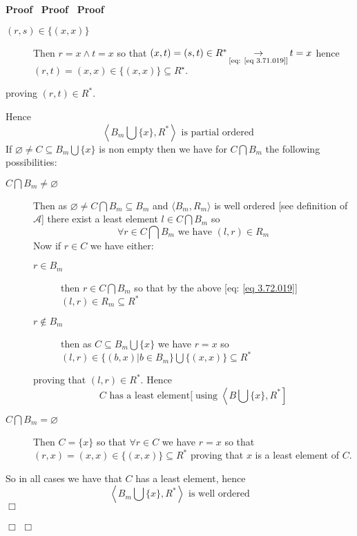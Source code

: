 \documentclass{book}
\newcommand{\Rightarrowlim}{\mathop{\rightarrow}\limits}
\newcommand{\nin}{\not\in}
\newcommand{\tmop}[1]{\ensuremath{\operatorname{#1}}}
\newenvironment{proof}{\noindent\textbf{Proof\ }}{\hspace*{\fill}$\Box$\medskip}
\begin{document}
\begin{proof}
\begin{proof}
\begin{proof}
\begin{description}
\begin{description}
          \item[$(r, s) \in \{ (x, x) \}$] Then $r = x \wedge t = x$ so that
          $(x, t) = (s, t) \in R^{\ast} \Rightarrowlim_{\text{[eq: \ref{eq
          3.71.019}]}} t = x$ hence $(r, t) = (x, x) \in \{ (x, x) \}
          \subseteq R^{\star} .$
        \end{description}
        proving $ (r, t) \in R^{\ast}$.
      \end{description}
      Hence
      \[ \left\langle B_m \bigcup \{ x \}, R^{\ast} \right\rangle \text{ is
         partial ordered } \]
      If $\varnothing \neq C \subseteq B_m \bigcup \{ x \}$ is non empty then
      we have for $C \bigcap B_m$ the following possibilities:
      \begin{description}
        \item[$C \bigcap B_m \neq \varnothing$] Then as $\varnothing \neq C
        \bigcap B_m \subseteq B_m$ and $\langle B_m, R_m \rangle$ is well
        ordered [see definition of $\mathcal{A}$] there exist a least element
        $l \in C \bigcap B_m$ so
        \begin{equation}
          \label{eq 3.72.019} \forall r \in C \bigcap B_m \text{ we have } (l,
          r) \in R_m
        \end{equation}
        Now if $r \in C$ we have either:
        \begin{description}
          \item[$r \in B_m$] then $r \in C \bigcap B_m$ so that by the above
          [eq: \ref{eq 3.72.019}] $(l, r) \in R_m \subseteq R^{\ast}$
          
          \item[$r \nin B_m$] then as $C \subseteq B_m \bigcup \{ x \}$ we
          have $r = x$ so $(l, r) \in \{ (b, x) |b \in B_m \} \bigcup \{ (x,
          x) \} \subseteq R^{\ast}$
        \end{description}
        proving that $(l, r) \in R^{\ast}$. Hence
        \[ C \text{ has a least element[} \tmop{using} \left\langle B \bigcup
           \{ x \}, R^{\ast} \right] \]
        \item[$C \bigcap B_m = \varnothing$] Then $C = \{ x \}$ so that
        $\forall r \in C$ we have $r = x$ so that $(r, x) = (x, x) \in \{ (x,
        x) \} \subseteq R^{\ast}$ proving that $x$ is a least element of $C$.
      \end{description}
      So in all cases we have that $C$ has a least element, hence
      \[ \left\langle B_m \bigcup \{ x \}, R^{\ast} \right\rangle \text{ is
         well ordered} \]
    \end{proof}
    

\end{proof}
\end{proof}
\end{document}
